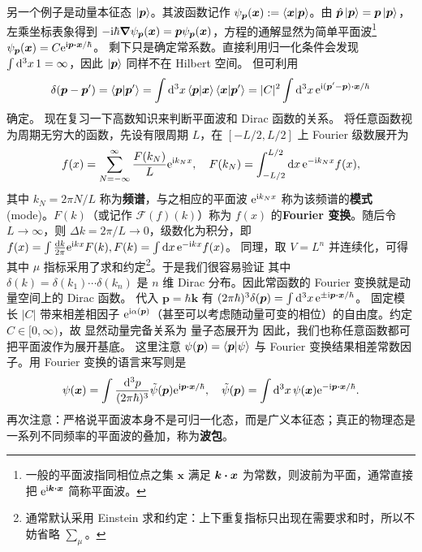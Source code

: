 另一个例子是动量本征态 $\ket{\bm p}$。其波函数记作 $\psi_{\bm p}(\bm x):=\ip{\bm x}{\bm p}$。由 $\hat{\bm p}\ket{\bm p}=\bm p\ket{\bm p}$，左乘坐标表象得到 $-\mathrm{i}\hbar\grad \psi_{\bm p}(\bm x)=\bm p \psi_{\bm p}(\bm x)$，方程的通解显然为简单平面波\footnote{一般的平面波指同相位点之集 $\bm x$ 满足 $\bm k\vdot\bm x$ 为常数，则波前为平面，通常直接把 $\e^{\i \bm k\vdot\bm x}$ 简称平面波。} $\psi_{\bm p}(\bm x) = C \e^{\i \bm p\vdot\bm x/\hbar}$。
剩下只是确定常系数。直接利用归一化条件会发现 $\int\dd[3]{x} 1=\infty$，因此 $\ket{\bm p}$ 同样不在 Hilbert 空间。
但可利用
\[
    \delta(\bm p-\bm p') = \ip{\bm p}{\bm p'} = \int\d[3]{x} \ip{\bm p}{\bm x} \ip{\bm x}{\bm p'} = |C|^2 \int\d[3]{x} \e^{\i (\bm p'-\bm p)\vdot\bm x/\hbar}
\]
确定。
现在复习一下高数知识来判断平面波和 Dirac 函数的关系。
将任意函数视为周期无穷大的函数，先设有限周期 $L$，在 $[-L/2,L/2]$ 上 Fourier 级数展开为
\[f(x)=\sum_{N=-\infty}^\infty \frac{F(k_N)}{L} \mathrm{e}^{\mathrm{i} k_N x},\quad F(k_N)=\int_{-L/2}^{L/2}\dd{x}\mathrm{e}^{-\mathrm{i} k_N x}f(x),\]
其中 $k_N={2\pi N}/{L}$ 称为\textbf{频谱}，与之相应的平面波 $\mathrm{e}^{\mathrm{i} k_N x}$ 称为该频谱的\textbf{模式}(mode)。$F(k)$（或记作 $\mathscr F(f)(k)$）称为 $f(x)$ 的\textbf{Fourier 变换}。随后令 $L\to\infty$，则 $\Delta k=2\pi/L\to 0$，级数化为积分，即 $f(x)=\int \frac{\dd k}{2\pi} \mathrm{e}^{\mathrm{i} k x}F(k),F(k)=\int\dd{x}\mathrm{e}^{-\mathrm{i} k x}f(x)$。
同理，取 $V=L^n$ 并连续化，可得
其中 $\mu$ 指标采用了求和约定\footnote{通常默认采用 Einstein 求和约定：上下重复指标只出现在需要求和时，所以不妨省略 $\sum_{\mu}$。}。于是我们很容易验证
其中 $\delta(k)=\delta(k_1)\cdots\delta(k_n)$ 是 $n$ 维 Dirac 分布。因此常函数的 Fourier 变换就是动量空间上的 Dirac 函数。
代入 $\bm p = \hbar\bm k$ 有 $(2\pi\hbar)^3\delta(\bm p) = \int\d[3]{x} \e^{\pm\i \bm p\vdot\bm x/\hbar}$。
固定模长 $|C|$ 带来相差相因子 $\mathrm{e}^{\mathrm{i}\alpha(\bm p)}$（甚至可以考虑随动量可变的相位）的自由度。约定 $C\in[0,\infty)$，故
显然动量完备关系为
量子态展开为
因此，我们也称任意函数都可把平面波作为展开基底。
这里注意 $\psi(\bm p)=\ip{\bm p}{\psi}$ 与 Fourier 变换结果相差常数因子。用 Fourier 变换的语言来写则是
\[
    \psi(\bm x) = \int\frac{\d[3]p}{(2\pi\hbar)^{3}} \tilde\psi(\bm p)  \e^{\i \bm p\vdot\bm x/\hbar},\quad \tilde\psi(\bm p) = \int \d[3]{x} \psi(\bm x)\e^{-\i \bm p\vdot\bm x/\hbar}.
\]
再次注意：严格说平面波本身不是可归一化态，而是广义本征态；真正的物理态是一系列不同频率的平面波的叠加，称为\textbf{波包}。


